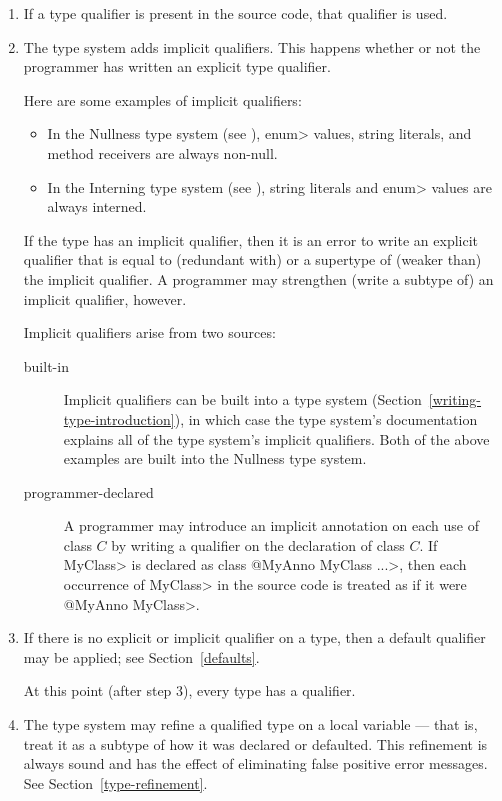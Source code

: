 \begin{enumerate}
\item
  If a type qualifier is present in the source code, that qualifier is used.

\item
  The type system adds implicit qualifiers.  This happens whether or not
  the programmer has written an explicit type qualifier.

  Here are some examples of implicit qualifiers:

\begin{itemize}
\item
  In the Nullness type system (see ),
  \<enum> values, string literals, and method receivers are always non-null.
\item
  In the Interning type system (see ),
  string literals and \<enum> values are always interned.
\end{itemize}

  If the type has an implicit qualifier, then it is an error to write an
  explicit qualifier that is equal to (redundant with) or a supertype of
  (weaker than) the implicit qualifier.  A programmer may strengthen
  (write a subtype of) an implicit qualifier, however.

  Implicit qualifiers arise from two sources:
\begin{description}
\item[built-in]
  Implicit qualifiers can be
  built into a type system (Section~\ref{writing-type-introduction}), in
  which case the type system's documentation explains all of the type
  system's implicit qualifiers.  Both of the above examples are built into
  the Nullness type system.
\item[programmer-declared]
  A programmer may introduce an implicit annotation on each use of class
  $C$ by writing a qualifier on the declaration of class $C$.  If \<MyClass>
  is declared as \<class @MyAnno MyClass \ttlcb...\ttrcb>, then each occurrence of
  \<MyClass> in the source code is treated as if it were \<@MyAnno
  MyClass>.
\end{description}



\item
  If there is no explicit or implicit qualifier on a type, then a default
  qualifier may be applied; see Section~\ref{defaults}.

  \smallskip

  At this point (after step 3), every type has a qualifier.

\item
  The type system may refine a qualified type on a local variable --- that
  is, treat it as a subtype of how it was declared or defaulted.  This
  refinement is always sound and has the effect of eliminating false
  positive error messages.  See Section~\ref{type-refinement}.


\end{enumerate}



